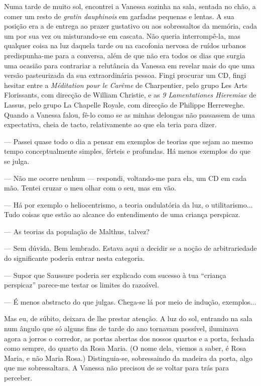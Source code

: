 Numa tarde de muito sol, encontrei a Vanessa sozinha na sala, sentada no
chão, a comer um resto de \emph{gratin dauphinois }em garfadas pequenas
e lentas. A sua posição era a de entrega ao prazer gustativo ou aos
sobressaltos da memória, cada um por sua vez ou misturando-se em
cascata. Não queria interrompê-la, mas qualquer coisa na luz daquela tarde ou na cacofonia nervosa de
ruídos urbanos predispunha-me para a conversa, além de que não era todos
os dias que surgia uma ocasião para contrariar a relutância da Vanessa
em revelar mais do que uma versão pasteurizada da sua extraordinária
pessoa. Fingi procurar um CD, fingi hesitar entre a \emph{Méditation
pour le Carême }de Charpentier, pelo grupo Les Arts Florissants, com
direcção de William Christie, e as \emph{9 Lamentationes Hieremiae }de
Lassus, pelo grupo La Chapelle Royale, com direcção de Philippe
Herreweghe. Quando a Vanessa falou, fê-lo como se
as minhas delongas não passassem de uma expectativa, cheia de tacto,
relativamente ao que ela teria para dizer.

--- Passei quase todo o dia a pensar em exemplos de teorias que sejam ao
  mesmo tempo conceptualmente simples, férteis e profundas. Há menos
  exemplos do que se julga.

--- Não me ocorre nenhum --- respondi, voltando-me para ela, um CD em cada
  mão. Tentei cruzar o meu olhar com o seu, mas em vão.

--- Há por exemplo o heliocentrismo, a teoria ondulatória da luz, o
  utilitarismo... Tudo coisas que estão ao alcance do entendimento de
  uma criança perspicaz.

--- As teorias da população de Malthus, talvez?

--- Sem dúvida. Bem lembrado. Estava aqui a decidir se a noção de
  arbitrariedade do significante poderia entrar nesta categoria.

--- Supor que Saussure poderia ser explicado com sucesso à tua ``criança
  perspicaz'' parece-me testar os limites do razoável.

--- É menos abstracto do que julgas. Chega-se lá por meio de indução,
  exemplos...


Mas eu, de súbito, deixara de lhe prestar atenção. A luz do sol,
entrando na sala num ângulo que só alguns fins de tarde do ano tornavam
possível, iluminava agora a jorros o corredor, as portas abertas dos
nossos quartos e a porta, fechada como sempre, do quarto da Rosa Maria.
(O nome dela, viemos a saber, é Rosa Maria, e não Maria Rosa.)
Distinguia-se, sobressaindo da madeira da porta, algo que me
sobressaltara. A Vanessa não precisou de se voltar para trás para
perceber.

